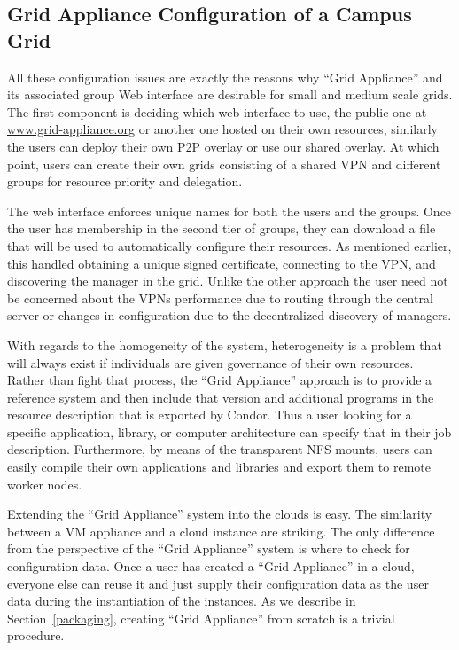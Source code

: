 \documentclass[conference]{IEEEtran}
\begin{document}
\subsection{Grid Appliance Configuration of a Campus Grid}

All these configuration issues are exactly the reasons why ``Grid Appliance''
and its associated group Web interface are desirable for small and medium scale
grids.  The first component is deciding which web interface to use, the public
one at \url{www.grid-appliance.org} or another one hosted on their own
resources, similarly the users can deploy their own P2P overlay or use our
shared overlay.  At which point, users can create their own grids consisting of
a shared VPN and different groups for resource priority and delegation.

The web interface enforces unique names for both the users and the groups.
Once the user has membership in the second tier of groups, they can download a
file that will be used to automatically configure their resources.  As
mentioned earlier, this handled obtaining a unique signed certificate,
connecting to the VPN, and discovering the manager in the grid.  Unlike the
other approach the user need not be concerned about the VPNs performance due to
routing through the central server or changes in configuration due to the
decentralized discovery of managers.

With regards to the homogeneity of the system, heterogeneity is a problem that
will always exist if individuals are given governance of their own resources.
Rather than fight that process, the ``Grid Appliance'' approach is to provide a
reference system and then include that version and additional programs in the
resource description that is exported by Condor.  Thus a user looking for a
specific application, library, or computer architecture can specify that in
their job description.  Furthermore, by means of the transparent NFS mounts,
users can easily compile their own applications and libraries and export them
to remote worker nodes.

Extending the ``Grid Appliance'' system into the clouds is easy.  The
similarity between a VM appliance and a cloud instance are striking.  The only
difference from the perspective of the ``Grid Appliance'' system is where to
check for configuration data.  Once a user has created a ``Grid Appliance'' in
a cloud, everyone else can reuse it and just supply their configuration data as
the user data during the instantiation of the instances.  As we describe in
Section~\ref{packaging}, creating ``Grid Appliance'' from scratch is a trivial
procedure.
\end{document}
